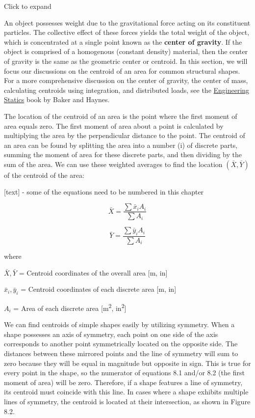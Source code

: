 \documentclass[
  letterpaper,
  DIV=11,
  numbers=noendperiod]{scrreprt}
\begin{document}
Click to expand

An object possesses weight due to the gravitational force acting on its
constituent particles. The collective effect of these forces yields the
total weight of the object, which is concentrated at a single point
known as the \textbf{center of gravity}. If the object is comprised of a
homogenous (constant density) material, then the center of gravity is
the same as the geometric center or centroid. In this section, we will
focus our discussions on the centroid of an area for common structural
shapes. For a more comprehensive discussion on the center of gravity,
the center of mass, calculating centroids using integration, and
distributed loads, see the
\href{https://engineeringstatics.org/Chapter_07-center-of-mass.html}{Engineering
Statics} book by Baker and Haynes.

The location of the centroid of an area is the point where the first
moment of area equals zero. The first moment of area about a point is
calculated by multiplying the area by the perpendicular distance to the
point. The centroid of an area can be found by splitting the area into a
number (i) of discrete parts, summing the moment of area for these
discrete parts, and then dividing by the sum of the area. We can use
these weighted averages to find the location \((\bar{X}, \bar{Y})\) of
the centroid of the area:

{[}text{]} - some of the equations need to be numbered in this chapter

\[
\bar{X}=\frac{\sum \bar{x}_i A_i}{\sum A_i}
\]

\[
\bar{Y}=\frac{\sum \bar{y}_i A_i}{\sum A_i}
\]

where

\(\bar{X}, \bar{Y}\) = Centroid coordinates of the overall area {[}m,
in{]}

\(\bar{x}_i, \bar{y}_i\) = Centroid coordinates of each discrete area
{[}m, in{]}

\(A_i\) = Area of each discrete area {[}m\textsuperscript{2},
in\textsuperscript{2}{]}

We can find centroids of simple shapes easily by utilizing symmetry.
When a shape possesses an axis of symmetry, each point on one side of
the axis corresponds to another point symmetrically located on the
opposite side. The distances between these mirrored points and the line
of symmetry will sum to zero because they will be equal in magnitude but
opposite in sign. This is true for every point in the shape, so the
numerator of equations 8.1 and/or 8.2 (the first moment of area) will be
zero. Therefore, if a shape features a line of symmetry, its centroid
must coincide with this line. In cases where a shape exhibits multiple
lines of symmetry, the centroid is located at their intersection, as
shown in Figure 8.2.
\end{document}

